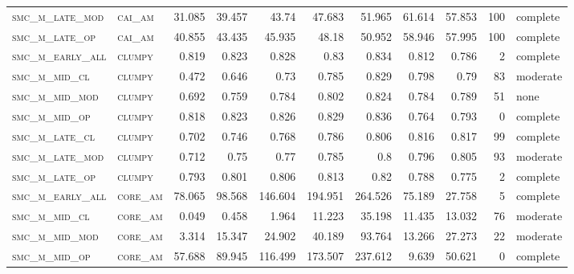 \begin{landscape}
\begin{center}
\begin{footnotesize}
\begin{longtable}{llrrrrr|rrr}
\textsc{smc\_m\_late\_mod } & \textsc{cai\_am   }   & 31.085   & 39.457   & 43.74    & 47.683   & 51.965   & 61.614      & 57.853        & 100           & complete \\
\textsc{smc\_m\_late\_op  } & \textsc{cai\_am   }   & 40.855   & 43.435   & 45.935   & 48.18    & 50.952   & 58.946      & 57.995        & 100           & complete \\
\textsc{smc\_m\_early\_all} & \textsc{clumpy    }   & 0.819    & 0.823    & 0.828    & 0.83     & 0.834    & 0.812       & 0.786         & 2             & complete \\
\textsc{smc\_m\_mid\_cl   } & \textsc{clumpy    }   & 0.472    & 0.646    & 0.73     & 0.785    & 0.829    & 0.798       & 0.79          & 83            & moderate \\
\textsc{smc\_m\_mid\_mod  } & \textsc{clumpy    }   & 0.692    & 0.759    & 0.784    & 0.802    & 0.824    & 0.784       & 0.789         & 51            & none \\
\textsc{smc\_m\_mid\_op   } & \textsc{clumpy    }   & 0.818    & 0.823    & 0.826    & 0.829    & 0.836    & 0.764       & 0.793         & 0             & complete     \\
\textsc{smc\_m\_late\_cl  } & \textsc{clumpy    }   & 0.702    & 0.746    & 0.768    & 0.786    & 0.806    & 0.816       & 0.817         & 99            & complete \\
\textsc{smc\_m\_late\_mod } & \textsc{clumpy    }   & 0.712    & 0.75     & 0.77     & 0.785    & 0.8      & 0.796       & 0.805         & 93            & moderate \\
\textsc{smc\_m\_late\_op  } & \textsc{clumpy    }   & 0.793    & 0.801    & 0.806    & 0.813    & 0.82     & 0.788       & 0.775         & 2             & complete \\
\textsc{smc\_m\_early\_all} & \textsc{core\_am  }   & 78.065   & 98.568   & 146.604  & 194.951  & 264.526  & 75.189      & 27.758        & 5             & complete \\
\textsc{smc\_m\_mid\_cl   } & \textsc{core\_am  }   & 0.049    & 0.458    & 1.964    & 11.223   & 35.198   & 11.435      & 13.032        & 76            & moderate \\
\textsc{smc\_m\_mid\_mod  } & \textsc{core\_am  }   & 3.314    & 15.347   & 24.902   & 40.189   & 93.764   & 13.266      & 27.273        & 22            & moderate \\
\textsc{smc\_m\_mid\_op   } & \textsc{core\_am  }   & 57.688   & 89.945   & 116.499  & 173.507  & 237.612  & 9.639       & 50.621        & 0             & complete     \\

\end{longtable}
\end{footnotesize}
\end{center}
\end{landscape}
